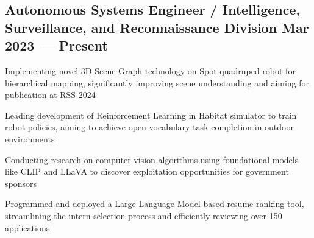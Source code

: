 \subsection{{Autonomous Systems Engineer / Intelligence, Surveillance, and Reconnaissance Division \hfill Mar 2023 --- Present}}
\begin{zitemize}
	\item Implementing novel 3D Scene-Graph technology on Spot quadruped robot for hierarchical mapping, significantly improving scene understanding and aiming for publication at RSS 2024
	\item Leading development of Reinforcement Learning in Habitat simulator to train robot policies, aiming to achieve open-vocabulary task completion in outdoor environments
	\item Conducting research on computer vision algorithms using foundational models like CLIP and LLaVA to discover exploitation opportunities for government sponsors
	\item Programmed and deployed a Large Language Model-based resume ranking tool, streamlining the intern selection process and efficiently reviewing over 150 applications

\end{zitemize}


